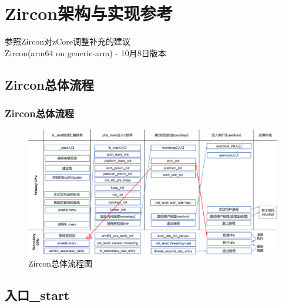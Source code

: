 \documentclass[
8pt, %
]{beamer}
\begin{document}
	\section{Zircon架构与实现参考}

	\begin{frame}
		\begin{center}
			{\LARGE 参照Zircon对zCore调整补充的建议\\}
			\bigskip\bigskip
			{\large Zircon(arm64 on generic-arm) - 10月8日版本}
		\end{center}
	\end{frame}

	\subsection{Zircon总体流程}

	\begin{frame}
		\frametitle{Zircon总体流程}
		\begin{figure}
			\includegraphics[width=1.0\linewidth]{zircon_flow.png}
			\caption{Zircon总体流程图}
		\end{figure}
	\end{frame}

	\subsection{入口\_start}
\end{document}
